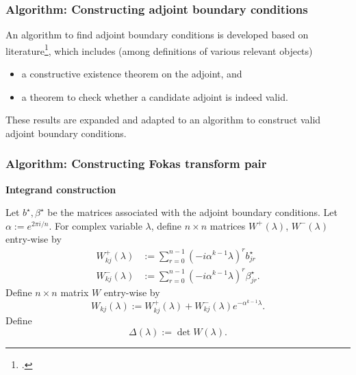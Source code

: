 \documentclass{beamer}
\begin{document}
\begin{frame}
    \frametitle{Algorithm: Constructing adjoint boundary conditions}

    An algorithm to find adjoint boundary conditions is developed based on literature\footcite{CoddingtonLevinson}, which includes (among definitions of various relevant objects)
    \begin{itemize}
        \item a constructive existence theorem on the adjoint, and
        \item a theorem to check whether a candidate adjoint is indeed valid.
    \end{itemize}
    These results are expanded and adapted to an algorithm to construct valid adjoint boundary conditions.
\end{frame}

\begin{frame}[t]
    \frametitle{Algorithm: Constructing Fokas transform pair}
    \textbf{Integrand construction}

    Let $b^\star, \beta^\star$ be the matrices associated with the adjoint boundary conditions.
    Let $\alpha := e^{2\pi i/n}$. For complex variable $\lambda$, define $n\times n$ matrices $W^+(\lambda)$, $W^-(\lambda)$ entry-wise by
        \begin{align*}
            W^+_{kj}(\lambda) &:= \sum_{r=0}^{n-1}(-i\alpha^{k-1}\lambda)^r b^\star_{jr}\\
            W^-_{kj}(\lambda) &:= \sum_{r=0}^{n-1}(-i\alpha^{k-1}\lambda)^r \beta^\star_{jr}.
        \end{align*}
    Define $n\times n$ matrix $W$ entry-wise by
    \begin{equation*}%
        W_{kj}(\lambda) := W^+_{kj}(\lambda) + W^-_{kj}(\lambda)e^{-\alpha^{k-1}\lambda}.
    \end{equation*}
    Define 
    \begin{equation*}%
        \Delta(\lambda):=\det W(\lambda).
    \end{equation*}
\end{frame}
\end{document}
